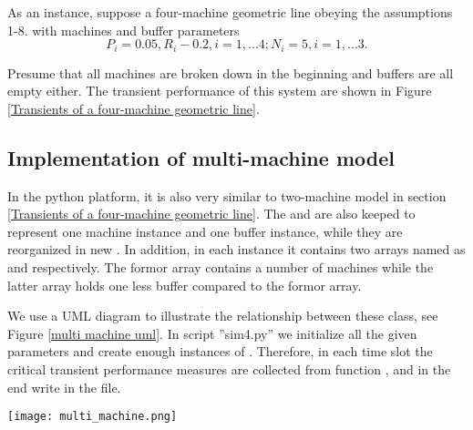   As an instance, suppose a four-machine geometric line obeying the assumptions 1-8. with machines and buffer parameters
  \begin{displaymath}
      P_i = 0.05, R_i-0.2, i = 1,...4; N_i = 5, i=1,...3.
  \end{displaymath}

  Presume that all machines are broken down in the beginning and buffers are all empty either. The transient performance of this system are shown in Figure \ref{Transients of a four-machine geometric line}.


\begin{figure*}[!h]
	\centering
	\caption{Transients of a four-machine geometric line. (a) $PR(n) \ and\ CR(n)$;(b) $WIP(n)$; (c) $ST_i(n)$;(d) $BL_i(n)$.}
	\label{Transients of a four-machine geometric line}
\end{figure*}

\subsection{Implementation of multi-machine model}
\noindent In the python platform, it is also very similar to two-machine model in section \ref{Transients of a four-machine geometric line}. The  and  are also keeped to represent one machine instance and one buffer instance, while they are reorganized in new . In addition, in each  instance it contains two arrays named as  and  respectively. The formor array contains a number of  machines while the latter array holds one less buffer compared to the formor array. 

We use a UML diagram to illustrate the relationship between these class, see Figure \ref{multi machine uml}. In script ''sim4.py'' we initialize all the given parameters and create enough instances of . Therefore, in each time slot the critical transient performance measures are collected from function , and in the end write in the file.

\begin{figure*}[!h]
	\centering
	\texttt{[image: multi\_machine.png]}
	\caption{UML diagram of a multi-machine model}
	\label{multi machine uml}
\end{figure*}